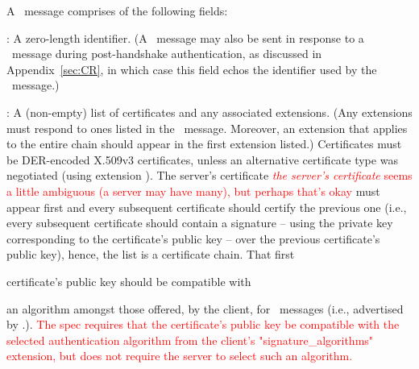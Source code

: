 A \Certificate\ message comprises of the following fields:

\begin{description}

\item \TLScertificateRequestContext: A zero-length identifier. (A
  \Certificate\ message may also be sent in response to a 
  \CertificateRequest\ message during post-handshake authentication, 
  as discussed in Appendix~\ref{sec:CR}, in which case this field 
  echos the identifier used by the \CertificateRequest\ message.)

\item \TLScertificateList: A (non-empty) list of certificates and any associated
  extensions.   %
%
  (Any extensions must respond to ones listed in the \ClientHello\ message.
  Moreover, an extension that applies to the entire chain should appear 
  in the first extension listed.)
  Certificates must be DER-encoded X.509v3 certificates, unless
  an alternative certificate type was negotiated (using extension 
  \TLSserverCertificateType). 
  The server's certificate 
  \ifPresentationNotes
  \textcolor{red}{\emph{the server's certificate} seems 
  a little ambiguous (a server may have many), but perhaps that's okay}
  \fi
  must appear first and every subsequent certificate should certify the 
  previous one (i.e., every subsequent certificate should contain a 
  signature -- using the private key corresponding to the certificate's
  public key -- over the previous certificate's public key), hence, the 
  list is a certificate chain. That first 
  \begin{comment}
  \sout{certificate must be signed using 
  an algorithm amongst those offered by the client 
  (\ClientHello.\TLSsignatureAlgorithms) and the}
  \textcolor{red}{I can't find any evidence to support that -- my mistake?}
  \end{comment}
  certificate's public key 
  should be compatible with \begin{comment}\sout{that algorithm}\end{comment}
  an algorithm amongst those offered, by the client, for \CertificateVerify\
  messages (i.e., advertised by \ClientHello.\TLSsignatureAlgorithms).
  \ifSpecNotes
  \textcolor{red}{
    The spec requires that the certificate's public key be compatible
    with the selected authentication algorithm from the client's 
    "signature\_algorithms" extension, but does not require the server
    to select such an algorithm.
}
\end{description}
